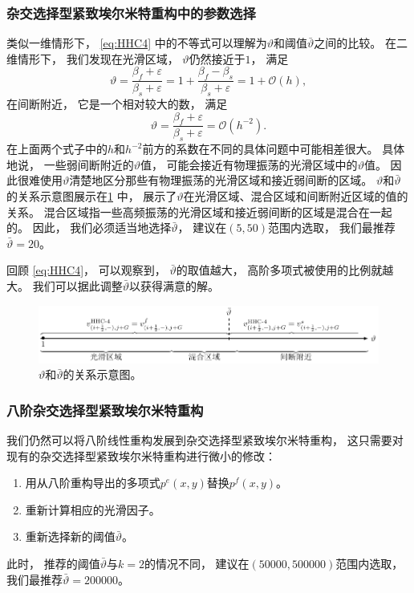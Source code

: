 \subsubsection{杂交选择型紧致埃尔米特重构中的参数选择}

类似一维情形下，
\cref{eq:HHC4} 中的不等式可以理解为$\vartheta$和阈值$\bar\vartheta$之间的比较。
在二维情形下，
我们发现在光滑区域，
$\vartheta$仍然接近于$1$，
满足
\begin{equation}
  \label{eq:vartheta-in-smooth}
  \vartheta = \frac{\beta_{{f}}+ \varepsilon}{\beta_{{s}}+ \varepsilon}
  = 1 + \frac{\beta_{{f}}- \beta_{{s}}}{\beta_{{s}}+ \varepsilon}= 1 + {\mathcal{O}}(h),
\end{equation}
在间断附近，
它是一个相对较大的数，
满足
\begin{equation}
  \vartheta = \frac{\beta_{{f}}+ \varepsilon}{\beta_{{s}}+ \varepsilon}= {\mathcal{O}}(h^{-2}).
\end{equation}
在上面两个式子中的$h$和$h^{-2}$前方的系数在不同的具体问题中可能相差很大。
具体地说，
一些弱间断附近的$\vartheta$值，
可能会接近有物理振荡的光滑区域中的$\vartheta$值。
因此很难使用$\vartheta$清楚地区分那些有物理振荡的光滑区域和接近弱间断的区域。
$\vartheta$和$\bar\vartheta$的关系示意图展示在\cref{fig:vartheta} 中，
展示了$\vartheta$在光滑区域、混合区域和间断附近区域的值的关系。
混合区域指一些高频振荡的光滑区域和接近弱间断的区域是混合在一起的。
因此，
我们必须适当地选择$\bar\vartheta$，
建议在$(5,50)$范围内选取，
我们最推荐$\bar\vartheta=20$。

回顾 \cref{eq:HHC4}，
可以观察到，
$\bar\vartheta$的取值越大，
高阶多项式被使用的比例就越大。
我们可以据此调整$\bar\vartheta$以获得满意的解。

\begin{figure}[htbp]
  \centering
  \includegraphics{fig/tikz/vartheta-2D.pdf}
  \caption{$\vartheta$和$\bar\vartheta$的关系示意图。
  }
  \label{fig:vartheta}
\end{figure}

\subsubsection{八阶杂交选择型紧致埃尔米特重构}

我们仍然可以将八阶线性重构发展到杂交选择型紧致埃尔米特重构，
这只需要对现有的杂交选择型紧致埃尔米特重构进行微小的修改：
\begin{enumerate}
  \item 用从八阶重构导出的多项式$p^{{e}}(x,y)$替换$p^{{f}}(x,y)$。
  \item 重新计算相应的光滑因子。
  \item 重新选择新的阈值$\bar\vartheta$。
\end{enumerate}
此时，
推荐的阈值$\bar\vartheta$与$k=2$的情况不同，
建议在$(50000,500000)$范围内选取，
我们最推荐$\bar\vartheta=200000$。

